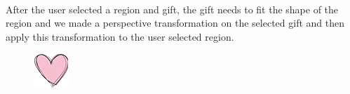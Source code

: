 \paragraph{} After the user selected a region and gift, the gift needs to fit the shape of the region and we made a perspective transformation on the selected gift and then apply this transformation to the user selected region. 
\begin{figure}[H]
\centering
\begin{minipage}[H]{0.3\textwidth}
\includegraphics[width=.95\textwidth]{section04/assets/OriginalGift.png}
\subcaption{\label{OriginalGift}}
\end{minipage}%
\begin{minipage}[H]{0.3\textwidth}

\end{minipage}
\end{figure}
